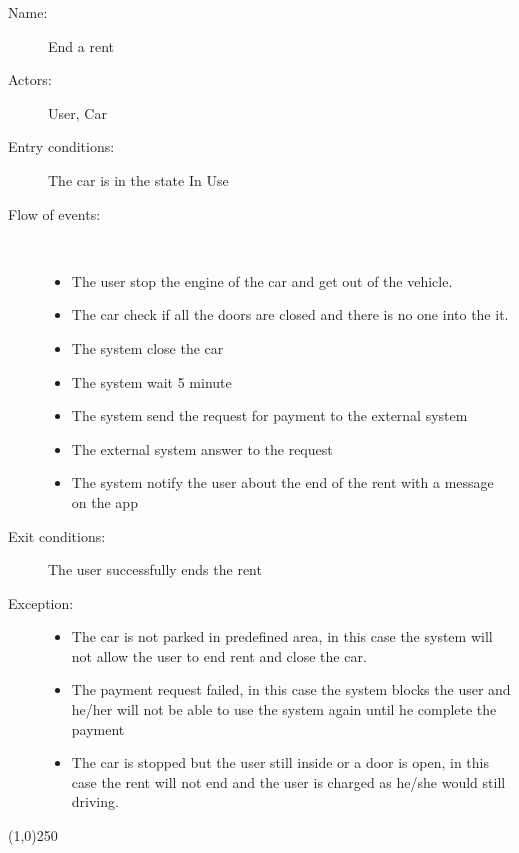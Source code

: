 \begin{description}
	\item[Name:] End a rent
	\item[Actors:] User, Car
	\item[Entry conditions:] The car is in the state In Use
	\item[Flow of events:]  \ \\
		\begin{itemize}
			\item The user stop the engine of the car and get out of the vehicle.
			\item The car check if all the doors are closed and there is no one into the it.
			\item The system close the car
			\item The system wait 5 minute
			\item The system send the request for payment to the external system
			\item The external system answer to the request
			\item The system notify the user about the end of the rent with a message on the app
		\end{itemize}
	\item[Exit conditions:] The user successfully ends the rent
	\item [Exception:]
		\begin{itemize}
			\item The car is not parked in predefined area, in this case the system will not allow the user to end rent and close the car.
			\item The payment request failed, in this case the system blocks the user and he/her will not be able to use the system  again until he complete the payment
			\item The car is stopped but the user still inside or a door is open, in this case the rent will not end and the user is charged as he/she would still driving.
		\end{itemize}
\end{description}

\begin{center}
\line(1,0){250}
\end{center}

